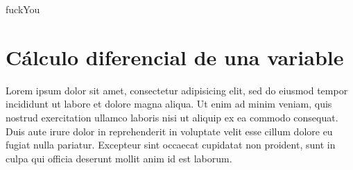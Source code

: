 
\begin{htmlDiv}{fuckYou}

\chapter{Cálculo diferencial de una variable} %
\label{cha:calculo-diferencial-de-una-variable}

Lorem ipsum dolor sit amet, consectetur adipisicing elit, sed do eiusmod
tempor incididunt ut labore et dolore magna aliqua. Ut enim ad minim veniam,
quis nostrud exercitation ullamco laboris nisi ut aliquip ex ea commodo
consequat. Duis aute irure dolor in reprehenderit in voluptate velit esse
cillum dolore eu fugiat nulla pariatur. Excepteur sint occaecat cupidatat non
proident, sunt in culpa qui officia deserunt mollit anim id est laborum.

\end{htmlDiv}



